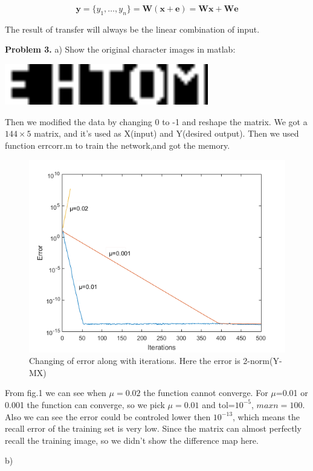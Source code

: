\documentclass[epsfig]{article}
\def\bpar{\vskip26pt}
\def\npar{\vskip13pt}
\def\spar{\vskip10pt}
\begin{document}
$${\textbf{y}=\{y_1,\dots, y_n\} = \textbf{W}(\textbf{x}+\textbf{e})=\textbf{Wx}+\textbf{We}}$$

The result of transfer will always be the linear combination of input.



\bpar\npar
{\bf Problem 3.}
\spar
a)\spar
Show the original character images in matlab:
\spar
	\centerline{\includegraphics[width=3.5in]{oricha.png}} 
\spar
Then we modified the data by changing 0 to -1 and reshape the matrix. We got a $ 144 \times 5 $ matrix, and it's used as X(input) and Y(desired output). Then we used function errcorr.m to train the network,and got the memory.\\

\begin{figure}[H] 
	\centering\includegraphics[width=4.5in]{train.png} 
	\caption{Changing of error along with iterations. Here the error is 2-norm(Y-MX)}\label{fig:1} 
\end{figure} 

From fig.1 we can see when $\mu=0.02$ the function cannot converge. For $\mu$=0.01 or 0.001 the function can converge, so we pick $\mu=0.01$ and 
tol=$10^{-5}$, $max n=100$. Also we can see the error could be controled lower then $10^{-13}$, which means the recall error of the training set is very low. Since the matrix can almost perfectly recall the training image, so we didn't show the difference map here.\spar

b)\spar
\end{document}
